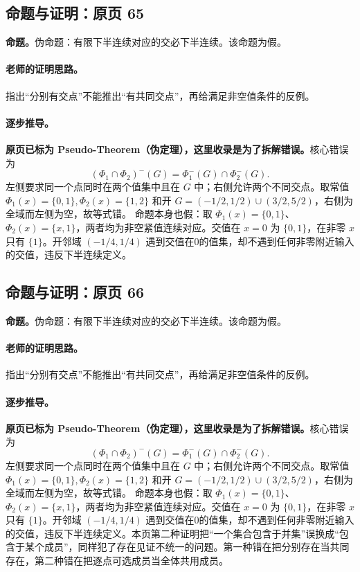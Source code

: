 \documentclass[11pt,a4paper]{article}
\theoremstyle{definition}\newtheorem{definition}{定义}\newtheorem{example}{例}
\begin{document}
\subsection{命题与证明：原页 65}

\textbf{命题。}伪命题：有限下半连续对应的交必下半连续。该命题为假。

\paragraph{老师的证明思路。}指出“分别有交点”不能推出“有共同交点”，再给满足非空值条件的反例。

\paragraph{逐步推导。}\textbf{原页已标为 Pseudo-Theorem（伪定理），这里收录是为了拆解错误。}核心错误为
\[(\Phi_1\cap\Phi_2)^-(G)=\Phi_1^-(G)\cap\Phi_2^-(G).\]
左侧要求同一个点同时在两个值集中且在 $G$ 中；右侧允许两个不同交点。取常值 $\Phi_1(x)=\{0,1\},\Phi_2(x)=\{1,2\}$ 和开 $G=(-1/2,1/2)\cup(3/2,5/2)$，右侧为全域而左侧为空，故等式错。
命题本身也假：取 $\Phi_1(x)=\{0,1\}$、$\Phi_2(x)=\{x,1\}$，两者均为非空紧值连续对应。交值在 $x=0$ 为 $\{0,1\}$，在非零 $x$ 只有 $\{1\}$。开邻域 $(-1/4,1/4)$ 遇到交值在0的值集，却不遇到任何非零附近输入的交值，违反下半连续定义。

\subsection{命题与证明：原页 66}

\textbf{命题。}伪命题：有限下半连续对应的交必下半连续。该命题为假。

\paragraph{老师的证明思路。}指出“分别有交点”不能推出“有共同交点”，再给满足非空值条件的反例。

\paragraph{逐步推导。}\textbf{原页已标为 Pseudo-Theorem（伪定理），这里收录是为了拆解错误。}核心错误为
\[(\Phi_1\cap\Phi_2)^-(G)=\Phi_1^-(G)\cap\Phi_2^-(G).\]
左侧要求同一个点同时在两个值集中且在 $G$ 中；右侧允许两个不同交点。取常值 $\Phi_1(x)=\{0,1\},\Phi_2(x)=\{1,2\}$ 和开 $G=(-1/2,1/2)\cup(3/2,5/2)$，右侧为全域而左侧为空，故等式错。
命题本身也假：取 $\Phi_1(x)=\{0,1\}$、$\Phi_2(x)=\{x,1\}$，两者均为非空紧值连续对应。交值在 $x=0$ 为 $\{0,1\}$，在非零 $x$ 只有 $\{1\}$。开邻域 $(-1/4,1/4)$ 遇到交值在0的值集，却不遇到任何非零附近输入的交值，违反下半连续定义。本页第二种证明把“一个集合包含于并集”误换成“包含于某个成员”，同样犯了存在见证不统一的问题。第一种错在把分别存在当共同存在，第二种错在把逐点可选成员当全体共用成员。
\end{document}
